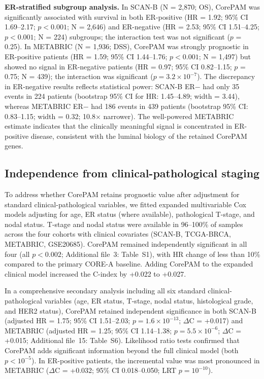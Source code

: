\documentclass[pdflatex,sn-vancouver-num]{sn-jnl}
\begin{document}
\textbf{ER-stratified subgroup analysis.} In SCAN-B (N = 2,870; OS), CorePAM was significantly associated with survival in both ER-positive (HR = 1.92; 95\% CI 1.69--2.17; $p < 0.001$; N = 2,646) and ER-negative (HR = 2.53; 95\% CI 1.51--4.25; $p < 0.001$; N = 224) subgroups; the interaction test was not significant ($p$ = 0.25). In METABRIC (N = 1,936; DSS), CorePAM was strongly prognostic in ER-positive patients (HR = 1.59; 95\% CI 1.44--1.76; $p < 0.001$; N = 1,497) but showed no signal in ER-negative patients (HR = 0.97; 95\% CI 0.82--1.15; $p$ = 0.75; N = 439); the interaction was significant ($p = 3.2 \times 10^{-7}$). The discrepancy in ER-negative results reflects statistical power: SCAN-B ER$-$ had only 35 events in 224 patients (bootstrap 95\% CI for HR: 1.45--4.89; width = 3.44), whereas METABRIC ER$-$ had 186 events in 439 patients (bootstrap 95\% CI: 0.83--1.15; width = 0.32; 10.8$\times$ narrower). The well-powered METABRIC estimate indicates that the clinically meaningful signal is concentrated in ER-positive disease, consistent with the luminal biology of the retained CorePAM genes.

\subsection{Independence from clinical-pathological staging}\label{subsec:results-staging}

To address whether CorePAM retains prognostic value after adjustment for standard clinical-pathological variables, we fitted expanded multivariable Cox models adjusting for age, ER status (where available), pathological T-stage, and nodal status. T-stage and nodal status were available in 96--100\% of samples across the four cohorts with clinical covariates (SCAN-B, TCGA-BRCA, METABRIC, GSE20685). CorePAM remained independently significant in all four (all $p < 0.002$; Additional file~3: Table~S1), with HR change of less than 10\% compared to the primary CORE-A baseline. Adding CorePAM to the expanded clinical model increased the C-index by +0.022 to +0.027.

In a comprehensive secondary analysis including all six standard clinical-pathological variables (age, ER status, T-stage, nodal status, histological grade, and HER2 status), CorePAM retained independent significance in both SCAN-B (adjusted HR = 1.75; 95\% CI 1.51--2.03; $p = 1.6 \times 10^{-13}$; $\Delta$C = +0.017) and METABRIC (adjusted HR = 1.25; 95\% CI 1.14--1.38; $p = 5.5 \times 10^{-6}$; $\Delta$C = +0.015; Additional file~15: Table~S6). Likelihood ratio tests confirmed that CorePAM adds significant information beyond the full clinical model (both $p < 10^{-5}$). In ER-positive patients, the incremental value was most pronounced in METABRIC ($\Delta$C = +0.032; 95\% CI 0.018--0.050; LRT $p = 10^{-10}$).
\end{document}

